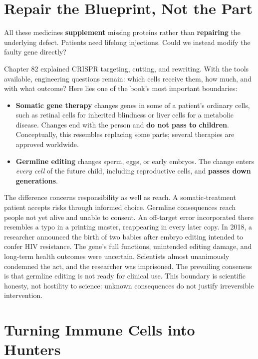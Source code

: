 \section{Repair the Blueprint, Not the Part}

All these medicines \textbf{supplement} missing proteins rather than \textbf{repairing} the underlying defect. Patients need lifelong injections. Could we instead modify the faulty gene directly?

Chapter 82 explained CRISPR targeting, cutting, and rewriting. With the tools available, engineering questions remain: which cells receive them, how much, and with what outcome? Here lies one of the book's most important boundaries:

\begin{itemize}[itemsep=2pt]
\item \textbf{Somatic gene therapy} changes genes in some of a patient's ordinary cells, such as retinal cells for inherited blindness or liver cells for a metabolic disease. Changes end with the person and \textbf{do not pass to children}. Conceptually, this resembles replacing some parts; several therapies are approved worldwide.
\item \textbf{Germline editing} changes sperm, eggs, or early embryos. The change enters \emph{every cell} of the future child, including reproductive cells, and \textbf{passes down generations}.
\end{itemize}

The difference concerns responsibility as well as reach. A somatic-treatment patient accepts risks through informed choice. Germline consequences reach people not yet alive and unable to consent. An off-target error incorporated there resembles a typo in a printing master, reappearing in every later copy. In 2018, a researcher announced the birth of two babies after embryo editing intended to confer HIV resistance. The gene's full functions, unintended editing damage, and long-term health outcomes were uncertain. Scientists almost unanimously condemned the act, and the researcher was imprisoned. The prevailing consensus is that germline editing is not ready for clinical use. This boundary is scientific honesty, not hostility to science: unknown consequences do not justify irreversible intervention.

\section{Turning Immune Cells into Hunters}

